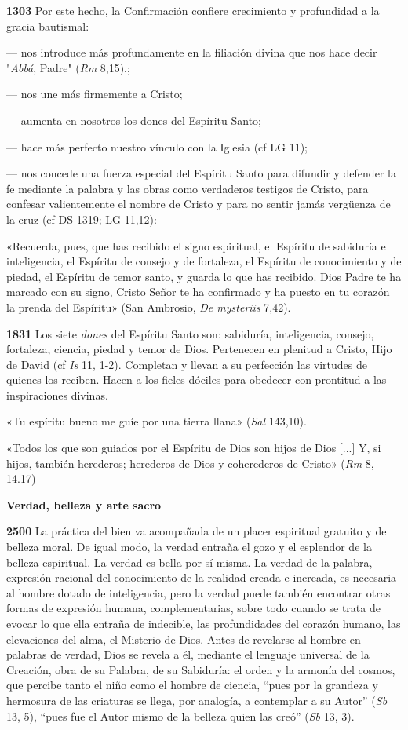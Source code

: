 \documentclass[]{article}
\begin{document}
\textbf{1303} Por este hecho, la Confirmación confiere crecimiento y
profundidad a la gracia bautismal:

--- nos introduce más profundamente en la filiación divina que nos hace
decir "\emph{Abbá}, Padre" (\emph{Rm} 8,15).;

--- nos une más firmemente a Cristo;

--- aumenta en nosotros los dones del Espíritu Santo;

--- hace más perfecto nuestro vínculo con la Iglesia (cf LG 11);

--- nos concede una fuerza especial del Espíritu Santo para difundir y
defender la fe mediante la palabra y las obras como verdaderos testigos
de Cristo, para confesar valientemente el nombre de Cristo y para no
sentir jamás vergüenza de la cruz (cf DS 1319; LG 11,12):

«Recuerda, pues, que has recibido el signo espiritual, el Espíritu de
sabiduría e inteligencia, el Espíritu de consejo y de fortaleza, el
Espíritu de conocimiento y de piedad, el Espíritu de temor santo, y
guarda lo que has recibido. Dios Padre te ha marcado con su signo,
Cristo Señor te ha confirmado y ha puesto en tu corazón la prenda del
Espíritu» (San Ambrosio, \emph{De mysteriis} 7,42).

\textbf{1831} Los siete \emph{dones} del Espíritu Santo son: sabiduría,
inteligencia, consejo, fortaleza, ciencia, piedad y temor de Dios.
Pertenecen en plenitud a Cristo, Hijo de David (cf \emph{Is} 11, 1-2).
Completan y llevan a su perfección las virtudes de quienes los reciben.
Hacen a los fieles dóciles para obedecer con prontitud a las
inspiraciones divinas.

«Tu espíritu bueno me guíe por una tierra llana» (\emph{Sal} 143,10).

«Todos los que son guiados por el Espíritu de Dios son hijos de Dios
{[}...{]} Y, si hijos, también herederos; herederos de Dios y
coherederos de Cristo» (\emph{Rm} 8, 14.17)

\textbf{Verdad, belleza y arte sacro}

\textbf{2500} La práctica del bien va acompañada de un placer espiritual
gratuito y de belleza moral. De igual modo, la verdad entraña el gozo y
el esplendor de la belleza espiritual. La verdad es bella por sí misma.
La verdad de la palabra, expresión racional del conocimiento de la
realidad creada e increada, es necesaria al hombre dotado de
inteligencia, pero la verdad puede también encontrar otras formas de
expresión humana, complementarias, sobre todo cuando se trata de evocar
lo que ella entraña de indecible, las profundidades del corazón humano,
las elevaciones del alma, el Misterio de Dios. Antes de revelarse al
hombre en palabras de verdad, Dios se revela a él, mediante el lenguaje
universal de la Creación, obra de su Palabra, de su Sabiduría: el orden
y la armonía del cosmos, que percibe tanto el niño como el hombre de
ciencia, ``pues por la grandeza y hermosura de las criaturas se llega,
por analogía, a contemplar a su Autor'' (\emph{Sb} 13, 5), ``pues fue el
Autor mismo de la belleza quien las creó'' (\emph{Sb} 13, 3).
\end{document}
